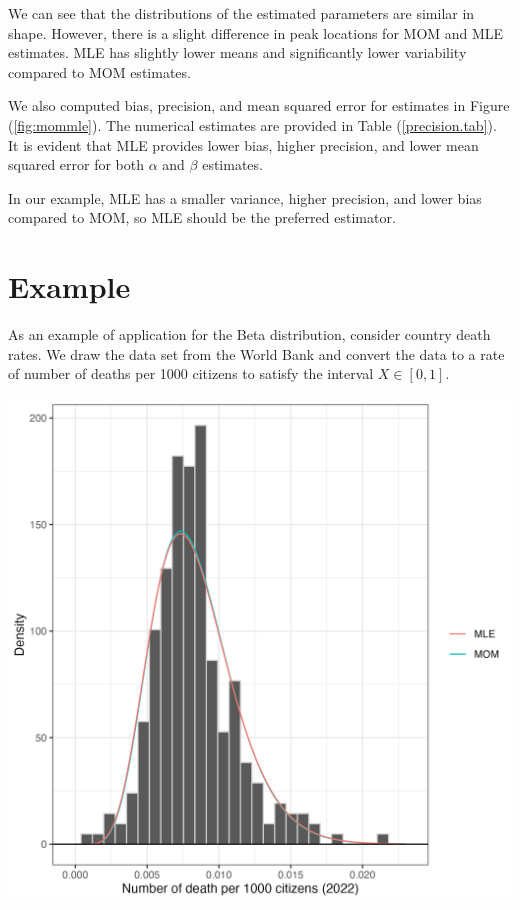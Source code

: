 \documentclass{article}\usepackage[]{graphicx}\usepackage[]{xcolor}
\newenvironment{Figure}
  {\par\medskip\noindent\minipage{\linewidth}}
  {\endminipage\par\medskip}
\begin{document}
\begin{multicols}{2}
We can see that the distributions of the estimated parameters are similar in shape. However, there is a slight difference in peak locations for MOM and MLE estimates. MLE has slightly lower means and significantly lower variability compared to MOM estimates.

We also computed bias, precision, and mean squared error for estimates in Figure (\ref{fig:mommle}). The numerical estimates are provided in Table (\ref{precision.tab}). It is evident that MLE provides lower bias, higher precision, and lower mean squared error for both $\alpha$ and $\beta$ estimates.

In our example, MLE has a smaller variance, higher precision, and lower bias compared to MOM, so MLE should be the preferred estimator.


\section{Example}\label{sec:examp}
As an example of application for the Beta distribution, consider country death rates. We draw the data set from the World Bank and convert the data to a rate of number of deaths per 1000 citizens to satisfy the interval $X \in [0,1]$.

\begin{Figure}
 \centering
 \includegraphics[width=\linewidth]{deathdata.png}
 \label{fig:deathdata}
\end{Figure}



\end{multicols}
\end{document}
